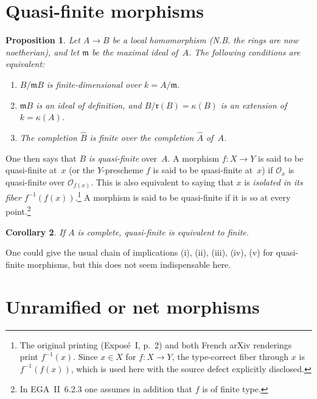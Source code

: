 \documentclass[11pt,oneside]{amsbook}
\newtheorem{proposition}{Proposition}[section]
\newtheorem{corollary}[proposition]{Corollary}
\begin{document}
\section{Quasi-finite morphisms}
\label{I.2}

\begin{proposition}
\label{I.2.1}
Let \(A\to B\) be a local homomorphism (N.B. the rings are now
noetherian), and let \(\mathfrak m\) be the maximal ideal of~\(A\).  The
following conditions are equivalent:
\begin{enumerate}
\item[(i)] \(B/\mathfrak mB\) is finite-dimensional over
  \(k=A/\mathfrak m\).
\item[(ii)] \(\mathfrak mB\) is an ideal of definition, and
  \(B/\mathfrak r(B)=\kappa(B)\) is an extension of
  \(k=\kappa(A)\).
\item[(iii)] The completion \(\widehat B\) is finite over the completion
  \(\widehat A\) of~\(A\).
\end{enumerate}
\end{proposition}

One then says that
\(B\) \emph{is quasi-finite} over~\(A\).  A morphism
\(f\colon X\to Y\) is said to be quasi-finite at~\(x\) (or the
\(Y\)-prescheme \(f\) is said to be quasi-finite at~\(x\)) if
\(\mathcal O_x\) is quasi-finite over \(\mathcal O_{f(x)}\).  This is also
equivalent to saying that \(x\) is \emph{isolated in its fiber}
\(f^{-1}(f(x))\).\footnote{The original printing (Exposé~I, p.~2) and both
French arXiv renderings print \(f^{-1}(x)\).  Since \(x\in X\) for
\(f\colon X\to Y\), the type-correct fiber through \(x\) is
\(f^{-1}(f(x))\), which is used here with the source defect explicitly
disclosed.} A morphism is said to be quasi-finite if it is so at
every point.\footnote{In EGA~II~6.2.3 one assumes in addition that \(f\) is
of finite type.}

\begin{corollary}
\label{I.2.2}
If \(A\) is complete, quasi-finite is equivalent to finite.
\end{corollary}

One could give the usual chain of implications \textup{(i), (ii), (iii),
(iv), (v)} for quasi-finite morphisms, but this does not seem indispensable
here.


\section{Unramified or net morphisms}
\label{I.3}
\end{document}
